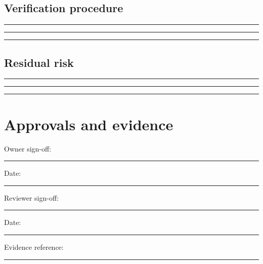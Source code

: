 \documentclass[11pt]{article}
\begin{document}
\subsection{Verification procedure}
\noindent\rule{\linewidth}{0.3pt}\par\vspace{0.18in}
\noindent\rule{\linewidth}{0.3pt}\par\vspace{0.18in}
\noindent\rule{\linewidth}{0.3pt}\par\vspace{0.14in}

\subsection{Residual risk}
\noindent\rule{\linewidth}{0.3pt}\par\vspace{0.18in}
\noindent\rule{\linewidth}{0.3pt}\par\vspace{0.18in}
\noindent\rule{\linewidth}{0.3pt}\par\vspace{0.14in}

\section{Approvals and evidence}
\noindent Owner sign-off: \rule{0.42\linewidth}{0.4pt}\hfill Date: \rule{0.19\linewidth}{0.4pt}\par\vspace{0.4cm}
\noindent Reviewer sign-off: \rule{0.40\linewidth}{0.4pt}\hfill Date: \rule{0.19\linewidth}{0.4pt}\par\vspace{0.4cm}
\noindent Evidence reference: \rule{0.70\linewidth}{0.4pt}
\end{document}
